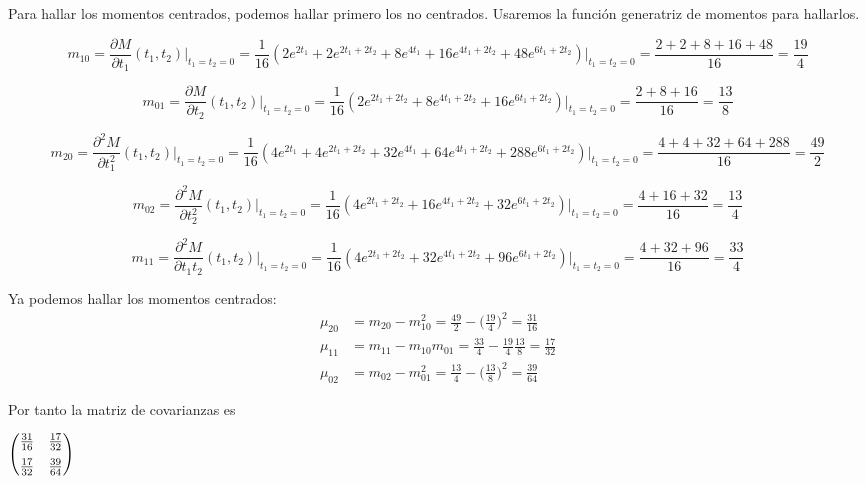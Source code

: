 \documentclass[tikz]{article}
\begin{document}
Para hallar los momentos centrados, podemos hallar primero los no
centrados. Usaremos la función generatriz de momentos para hallarlos.

\[m_{10} = \frac{\partial M}{\partial t_1}(t_1,t_2)\Big|_{t_1=t_2=0} =
  \frac{1}{16}(2e^{2t_1} + 2e^{2t_1+2t_2} + 8e^{4t_1} +
  16e^{4t_1+2t_2} + 48e^{6t_1+2t_2})\Big|_{t_1=t_2=0} =
  \frac{2+2+8+16+48}{16} = \frac{19}{4}\]

\[m_{01} = \frac{\partial M}{\partial t_2}(t_1,t_2)\Big|_{t_1=t_2=0} =
  \frac{1}{16}(2e^{2t_1+2t_2} + 8e^{4t_1+2t_2} +
  16e^{6t_1+2t_2})\Big|_{t_1=t_2=0} = \frac{2+8+16}{16} = \frac{13}{8}\]

\[m_{20} = \frac{\partial^2 M}{\partial
    t_1^2}(t_1,t_2)\Big|_{t_1=t_2=0} = \frac{1}{16}(4e^{2t_1} +
  4e^{2t_1+2t_2} + 32e^{4t_1} + 64e^{4t_1+2t_2} +
  288e^{6t_1+2t_2})\Big|_{t_1=t_2=0} = \frac{4+4+32+64+288}{16} =
  \frac{49}{2}\]

\[m_{02} = \frac{\partial^2 M}{\partial
    t_2^2}(t_1,t_2)\Big|_{t_1=t_2=0} = \frac{1}{16}(4e^{2t_1+2t_2} +
  16e^{4t_1+2t_2} + 32e^{6t_1+2t_2})\Big|_{t_1=t_2=0} =
  \frac{4+16+32}{16} = \frac{13}{4}\]

\[m_{11} = \frac{\partial^2 M}{\partial
    t_1t_2}(t_1,t_2)\Big|_{t_1=t_2=0} = \frac{1}{16}(4e^{2t_1+2t_2} +
  32e^{4t_1+2t_2} + 96e^{6t_1+2t_2})\Big|_{t_1=t_2=0} =
  \frac{4+32+96}{16} = \frac{33}{4}\]

\vspace{3mm}

Ya podemos hallar los momentos centrados:
\begin{align*}
  \mu_{20}&=m_{20}-m_{10}^2 = \frac{49}{2} - \Big(\frac{19}{4}\Big)^2 = \frac{31}{16} \\
  \mu_{11}&=m_{11}-m_{10}m_{01} = \frac{33}{4} - \frac{19}{4}\frac{13}{8} = \frac{17}{32} \\
  \mu_{02}&=m_{02}-m_{01}^2 = \frac{13}{4} - \Big(\frac{13}{8}\Big)^2 = \frac{39}{64}
\end{align*}

Por tanto la matriz de covarianzas es

\begin{center}
  $
  \begin{pmatrix}
    \frac{31}{16} & \frac{17}{32} \vspace{2mm}\\
    \frac{17}{32} & \frac{39}{64} 
  \end{pmatrix}
  $
\end{center}
\end{document}
